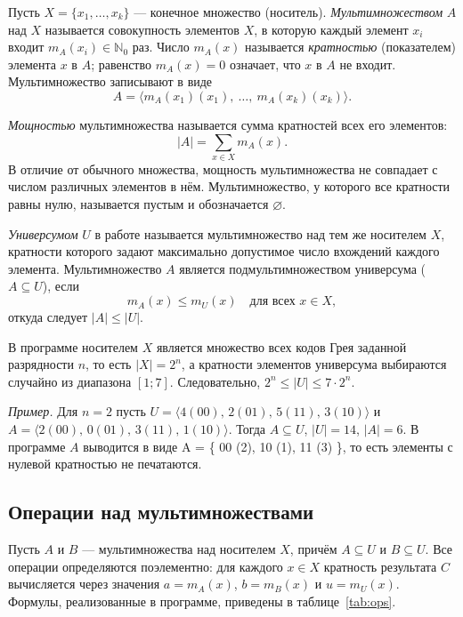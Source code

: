 \documentclass[14pt,a4paper]{extarticle}
\newcommand{\mult}[2]{m_{#1}(#2)}
\newcommand{\card}[1]{\left|#1\right|}
\newcommand{\NN}{\mathbb{N}_0}
\newcommand{\code}[1]{{\monofont #1}}
\begin{document}
Пусть $X=\{x_1,\ldots,x_k\}$ --- конечное множество (носитель). \emph{Мультимножеством} $A$ над $X$ называется совокупность элементов $X$, в которую каждый элемент $x_i$ входит $\mult{A}{x_i}\in\NN$ раз. Число $\mult{A}{x}$ называется \emph{кратностью} (показателем) элемента $x$ в $A$; равенство $\mult{A}{x}=0$ означает, что $x$ в $A$ не входит. Мультимножество записывают в виде
\[
A=\langle \mult{A}{x_1}(x_1),\ \ldots,\ \mult{A}{x_k}(x_k)\rangle .
\]

\emph{Мощностью} мультимножества называется сумма кратностей всех его элементов:
\begin{equation}
\card{A}=\sum_{x\in X}\mult{A}{x}.
\end{equation}
В отличие от обычного множества, мощность мультимножества не совпадает с числом различных элементов в нём. Мультимножество, у которого все кратности равны нулю, называется пустым и обозначается $\varnothing$.

\emph{Универсумом} $U$ в работе называется мультимножество над тем же носителем $X$, кратности которого задают максимально допустимое число вхождений каждого элемента. Мультимножество $A$ является подмультимножеством универсума ($A\subseteq U$), если
\begin{equation}
\mult{A}{x}\le \mult{U}{x}\quad\text{для всех }x\in X,
\end{equation}
откуда следует $\card{A}\le\card{U}$.

В программе носителем $X$ является множество всех кодов Грея заданной разрядности $n$, то есть $\card{X}=2^n$, а кратности элементов универсума выбираются случайно из диапазона $[1;7]$. Следовательно, $2^n\le\card{U}\le 7\cdot 2^n$.

\textit{Пример.} Для $n=2$ пусть $U=\langle 4(00),\,2(01),\,5(11),\,3(10)\rangle$ и $A=\langle 2(00),\,0(01),\,3(11),\,1(10)\rangle$. Тогда $A\subseteq U$, $\card{U}=14$, $\card{A}=6$. В программе $A$ выводится в виде \code{A = \{ 00 (2), 10 (1), 11 (3) \}}, то есть элементы с нулевой кратностью не печатаются.

\subsection{Операции над мультимножествами}

Пусть $A$ и $B$ --- мультимножества над носителем $X$, причём $A\subseteq U$ и $B\subseteq U$. Все операции определяются поэлементно: для каждого $x\in X$ кратность результата $C$ вычисляется через значения $a=\mult{A}{x}$, $b=\mult{B}{x}$ и $u=\mult{U}{x}$. Формулы, реализованные в программе, приведены в таблице~\ref{tab:ops}.
\end{document}
